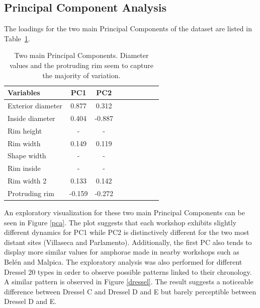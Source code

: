 \documentclass[review]{elsarticle}
\begin{document}
\subsection{Principal Component Analysis}

The loadings for the two main Principal Components of the dataset are listed in Table~\ref{table:pca}.

\begin{table}[htp]
\centering
\begin{tabular}{lcccccccc}
\hline
Variables & PC1 & PC2 \\ \hline
Exterior diameter & 0.877 & 0.312 \\
Inside diameter & 0.404 & -0.887 \\
Rim height & - & - \\
Rim width & 0.149 & 0.119 \\
Shape width & - & - \\
Rim inside & - & - \\
Rim width 2 & 0.133 & 0.142 \\
Protruding rim & -0.159 & -0.272 \\
\hline
\end{tabular}
\caption{Two main Principal Components. Diameter values and the protruding rim seem to capture the majority of variation.}
\label{table:pca}
\end{table}

An exploratory visualization for these two main Principal Components can be seen in Figure \ref{pca}. The plot suggests that each workshop exhibits slightly different dynamics for PC1 while PC2 is distinctively different for the two most distant sites (Villaseca and Parlamento). Additionally, the first PC also tends to display more similar values for amphorae made in nearby workshops such as Belén and Malpica. The exploratory analysis was also performed for different Dressel 20 types in order to observe possible patterns linked to their chronology. A similar pattern is observed in Figure \ref{dressel}. The result suggests a noticeable difference between Dressel C and Dressel D and E but barely perceptible between Dressel D and E.
\end{document}
